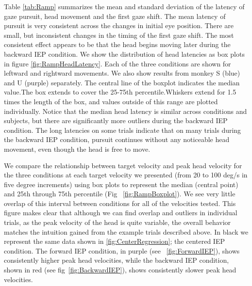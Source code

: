 \documentclass[12pt]{article}
\begin{document}
Table \ref{tab:Ramp} summarizes the mean and standard deviation of the latency of gaze pursuit, head movement and the first gaze shift. The mean latency of pursuit is very consistent across the changes in initial eye position. There are small, but inconsistent changes in the timing of the first gaze shift. The most consistent effect appears to be that the head begins moving later during the backward IEP condition. We show the distribution of head latencies as box plots in figure \ref{fig:RampHeadLatency}. Each of the three conditions are shown for leftward and rightward movements. We also show results from monkey S (blue) and U (purple) separately. The central line of the boxplot indicates the median value.The box extends to cover the 25-75th percentile.Whiskers extend for 1.5 times the length of the box, and values outside of this range are plotted individually. Notice that the median head latency is similar across conditions and subjects, but there are significantly more outliers during the backward IEP condition. The long latencies on some trials indicate that on many trials during the backward IEP condition, pursuit continues without any noticeable head movement, even though the head is free to move. 

We compare the relationship between target velocity and peak head velocity for the three conditions at each target velocity we presented (from 20 to 100 deg/s in five degree increments) using box plots to represent the median (central point) and 25th through 75th percentile (Fig ~\ref{fig:RampBoxplot}). We see very little overlap of this interval between conditions for all of the velocities tested. This figure makes clear that although we can find overlap and outliers in individual trials, as the peak velocity of the head is quite variable, the overall behavior matches the intuition gained from the example trials described above. In black we represent the same data shown in \ref{fig:CenterRegression}; the centered IEP condition. The forward IEP condition, in purple (see ~\ref{fig:ForwardIEP}), shows consistently higher peak head velocities, while the backward IEP condition, shown in red (see fig~\ref{fig:BackwardIEP}), shows consistently slower peak head velocities. 
\end{document}
